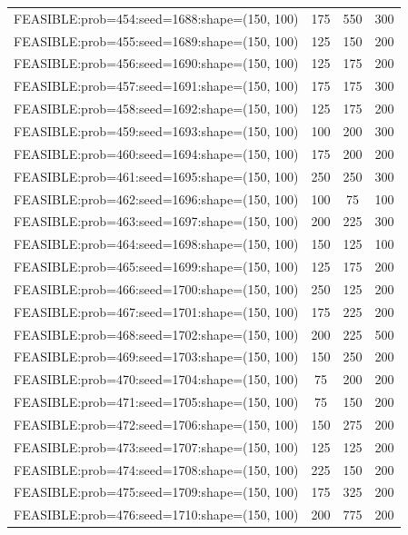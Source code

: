 \begin{longtable}{lccc}
FEASIBLE:prob=454:seed=1688:shape=(150, 100) &      175 &   550 &    300 \\
FEASIBLE:prob=455:seed=1689:shape=(150, 100) &      125 &   150 &    200 \\
FEASIBLE:prob=456:seed=1690:shape=(150, 100) &      125 &   175 &    200 \\
FEASIBLE:prob=457:seed=1691:shape=(150, 100) &      175 &   175 &    300 \\
FEASIBLE:prob=458:seed=1692:shape=(150, 100) &      125 &   175 &    200 \\
FEASIBLE:prob=459:seed=1693:shape=(150, 100) &      100 &   200 &    300 \\
FEASIBLE:prob=460:seed=1694:shape=(150, 100) &      175 &   200 &    200 \\
FEASIBLE:prob=461:seed=1695:shape=(150, 100) &      250 &   250 &    300 \\
FEASIBLE:prob=462:seed=1696:shape=(150, 100) &      100 &    75 &    100 \\
FEASIBLE:prob=463:seed=1697:shape=(150, 100) &      200 &   225 &    300 \\
FEASIBLE:prob=464:seed=1698:shape=(150, 100) &      150 &   125 &    100 \\
FEASIBLE:prob=465:seed=1699:shape=(150, 100) &      125 &   175 &    200 \\
FEASIBLE:prob=466:seed=1700:shape=(150, 100) &      250 &   125 &    200 \\
FEASIBLE:prob=467:seed=1701:shape=(150, 100) &      175 &   225 &    200 \\
FEASIBLE:prob=468:seed=1702:shape=(150, 100) &      200 &   225 &    500 \\
FEASIBLE:prob=469:seed=1703:shape=(150, 100) &      150 &   250 &    200 \\
FEASIBLE:prob=470:seed=1704:shape=(150, 100) &       75 &   200 &    200 \\
FEASIBLE:prob=471:seed=1705:shape=(150, 100) &       75 &   150 &    200 \\
FEASIBLE:prob=472:seed=1706:shape=(150, 100) &      150 &   275 &    200 \\
FEASIBLE:prob=473:seed=1707:shape=(150, 100) &      125 &   125 &    200 \\
FEASIBLE:prob=474:seed=1708:shape=(150, 100) &      225 &   150 &    200 \\
FEASIBLE:prob=475:seed=1709:shape=(150, 100) &      175 &   325 &    200 \\
FEASIBLE:prob=476:seed=1710:shape=(150, 100) &      200 &   775 &    200 \\

\end{longtable}
